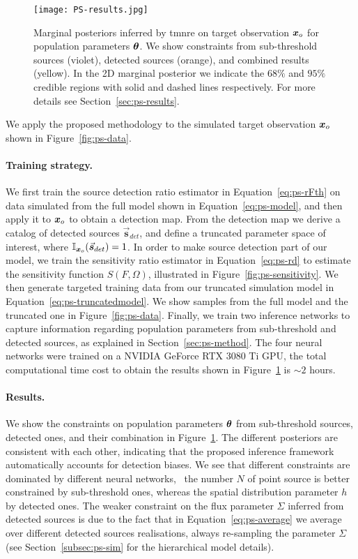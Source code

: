 \begin{figure}
\centering
      \texttt{[image: PS-results.jpg]}
    \caption{Marginal posteriors inferred by \gls*{tmnre} on target observation $\bm{x}_o$ for population parameters $\bm{\theta}$. We show constraints from sub-threshold sources (violet), detected sources (orange), and combined results (yellow). In the 2D marginal posterior we indicate the $68\%$ and $95\%$ credible regions with solid and dashed lines respectively. For more details see Section~\ref{sec:ps-results}.
}
\label{fig:ps-results}
\end{figure}

We apply the proposed methodology to the simulated target observation $\bm{x}_o$ shown in Figure~\ref{fig:ps-data}. 

\paragraph{Training strategy.} We first train the source detection ratio estimator in Equation~\eqref{eq:ps-rFth} on data simulated from the full model shown in Equation~\eqref{eq:ps-model}, and then apply it to $\bm{x}_o$ to obtain a detection map. From the detection map we derive a catalog of detected sources $\vec{\boldsymbol{s}}_{det}$, and define a truncated parameter space of interest, where $\mathbb{I}_{\bm{x}_o}(\vec{\boldsymbol{s}}_{det})=1$. In order to make source detection part of our model, we train the sensitivity ratio estimator in Equation~\eqref{eq:ps-rd} to estimate the sensitivity function $S(F, \Omega)$, illustrated in Figure~\ref{fig:ps-sensitivity}. We then generate targeted training data from our truncated simulation model in Equation~\eqref{eq:ps-truncatedmodel}. We show samples from the full model and the truncated one in Figure~\ref{fig:ps-data}. Finally, we train two inference networks to capture information regarding population parameters from sub-threshold and detected sources, as explained in Section~\ref{sec:ps-method}. 
The four neural networks were trained on a NVIDIA GeForce RTX 3080 Ti GPU, the total computational time cost to obtain the results shown in Figure~\ref{fig:ps-results} is $\sim 2$ hours. 

\paragraph{Results.} We show the constraints on population parameters $\bm{\theta}$  from sub-threshold sources, detected ones, and their combination in Figure~\ref{fig:ps-results}. The different posteriors are consistent with each other, indicating that the proposed inference framework automatically accounts for detection biases. We see that different constraints are dominated by different neural networks, \eg~the number $N$ of point source is better constrained by sub-threshold ones, whereas the spatial distribution parameter $h$ by detected ones. The weaker constraint on the flux parameter $\Sigma$ inferred from detected sources is due to the fact that in Equation~\eqref{eq:ps-average} we average over different detected sources realisations, always re-sampling the parameter $\Sigma$ (see Section~\ref{subsec:ps-sim} for the hierarchical model details).


